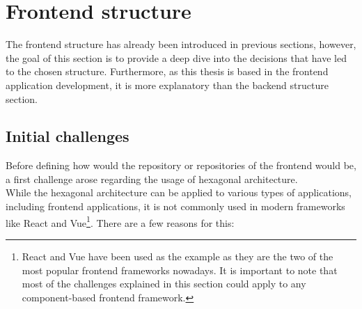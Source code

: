 \documentclass[../design.tex]{subfiles}
\begin{document}
\section{Frontend structure}
The frontend structure has already been introduced in previous sections,
however, the goal of this section is to provide a deep dive into the decisions
that have led to the chosen structure. Furthermore, as this thesis is based in
the frontend application development, it is more explanatory than the backend
structure section.
\subsection{Initial challenges}
Before defining how would the repository or repositories of the frontend would
be, a first challenge arose regarding the usage of hexagonal architecture.
\\
While the hexagonal architecture can be applied to various types of
applications, including frontend applications, it is not commonly used in modern
frameworks like React and Vue\footnote{React and Vue have been used as the
	example as they are the two of the most popular frontend frameworks nowadays. It
	is important to note that most of the challenges explained in this section could
	apply to any component-based frontend framework.}. There are a few reasons for
this:
\end{document}
